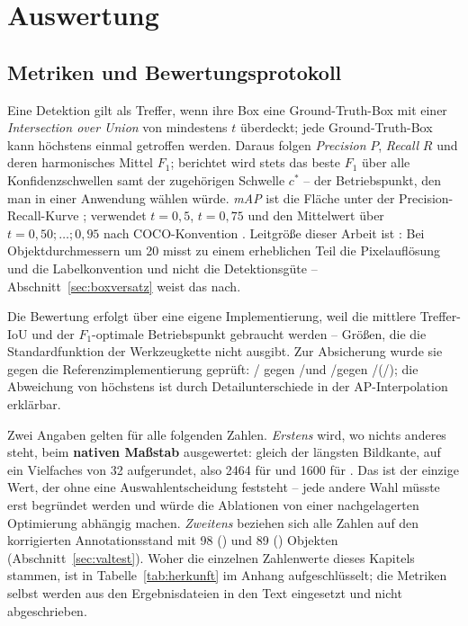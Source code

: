 \chapter{Auswertung}
\label{kap:auswertung}

\section{Metriken und Bewertungsprotokoll}
\label{sec:metriken}

Eine Detektion gilt als Treffer, wenn ihre Box eine Ground-Truth-Box mit einer
\emph{Intersection over Union} von mindestens $t$ überdeckt; jede
Ground-Truth-Box kann höchstens einmal getroffen werden. Daraus folgen
\emph{Precision} $P$, \emph{Recall} $R$ und deren harmonisches Mittel $F_1$;
berichtet wird stets das beste $F_1$ über alle Konfidenzschwellen samt der
zugehörigen Schwelle $c^*$ -- der Betriebspunkt, den man in einer Anwendung
wählen würde. \emph{mAP} ist die Fläche unter der Precision-Recall-Kurve
\parencite{everingham2010}; \mAPfifty{} verwendet $t = 0{,}5$, \mAPseven{}
$t = 0{,}75$ und \mAPall{} den Mittelwert über $t = 0{,}50; \dots; 0{,}95$ nach
COCO-Konvention \parencite{lin2014coco}. Leitgröße dieser Arbeit ist
\mAPfifty{}: Bei Objektdurchmessern um 20\px{} misst \mAPall{} zu einem
erheblichen Teil die Pixelauflösung und die Labelkonvention und nicht die
Detektionsgüte -- Abschnitt~\ref{sec:boxversatz} weist das nach.

Die Bewertung erfolgt über eine eigene Implementierung, weil die mittlere
Treffer-IoU und der $F_1$-optimale Betriebspunkt gebraucht werden -- Größen, die
die Standardfunktion der Werkzeugkette nicht ausgibt. Zur Absicherung wurde sie
gegen die Referenzimplementierung geprüft:  \zxcValEigen/\zxcValEigenA
gegen \zxcValUlt/\zxcValUltA und  \zxcTestEigen/\zxcTestEigenA gegen
\zxcTestUlt/\zxcTestUltA (\mAPfifty{}/\mAPall{}); die Abweichung von höchstens
\zxcMaxDiff\PP{} ist durch Detailunterschiede in der AP-Interpolation erklärbar.

Zwei Angaben gelten für alle folgenden Zahlen. \emph{Erstens} wird, wo nichts
anderes steht, beim \textbf{nativen Maßstab} ausgewertet:  gleich der
längsten Bildkante, auf ein Vielfaches von 32 aufgerundet, also 2464 für
 und 1600 für . Das ist der einzige Wert, der ohne eine
Auswahlentscheidung feststeht -- jede andere Wahl müsste erst begründet werden
und würde die Ablationen von einer nachgelagerten Optimierung abhängig machen.
\emph{Zweitens} beziehen sich alle Zahlen auf den korrigierten Annotationsstand
mit 98 () und 89 () Objekten
(Abschnitt~\ref{sec:valtest}). Woher die einzelnen Zahlenwerte dieses Kapitels
stammen, ist in Tabelle~\ref{tab:herkunft} im Anhang aufgeschlüsselt; die
Metriken selbst werden aus den Ergebnisdateien in den Text eingesetzt und nicht
abgeschrieben.

